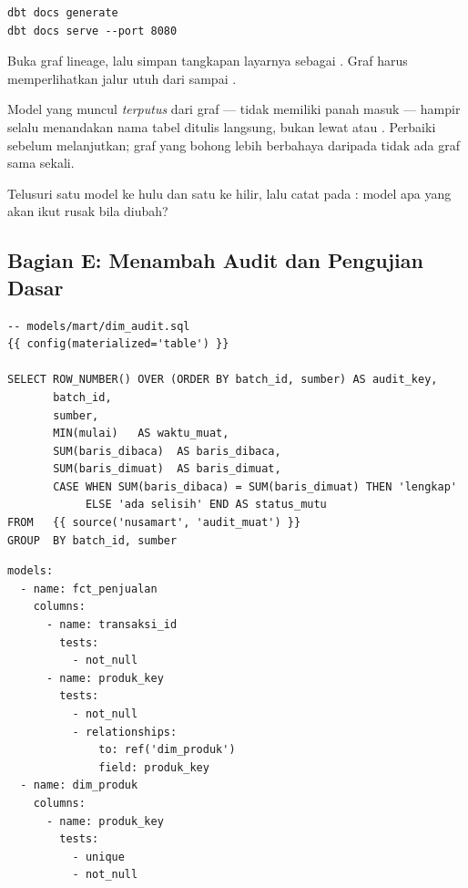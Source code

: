 
\begin{lstlisting}[style=shellgaya]
dbt docs generate
dbt docs serve --port 8080
\end{lstlisting}

Buka graf lineage, lalu simpan tangkapan layarnya sebagai
. Graf harus memperlihatkan jalur utuh dari
 sampai .

\begin{peringatan}
Model yang muncul \emph{terputus} dari graf --- tidak memiliki panah masuk ---
hampir selalu menandakan nama tabel ditulis langsung, bukan lewat
 atau . Perbaiki sebelum melanjutkan; graf yang
bohong lebih berbahaya daripada tidak ada graf sama sekali.
\end{peringatan}

Telusuri satu model ke hulu dan satu ke hilir, lalu catat pada
: model apa yang akan ikut rusak bila
 diubah?

\subsection{Bagian E: Menambah Audit dan Pengujian Dasar}


\begin{lstlisting}[style=sqlgaya]
-- models/mart/dim_audit.sql
{{ config(materialized='table') }}

SELECT ROW_NUMBER() OVER (ORDER BY batch_id, sumber) AS audit_key,
       batch_id,
       sumber,
       MIN(mulai)   AS waktu_muat,
       SUM(baris_dibaca)  AS baris_dibaca,
       SUM(baris_dimuat)  AS baris_dimuat,
       CASE WHEN SUM(baris_dibaca) = SUM(baris_dimuat) THEN 'lengkap'
            ELSE 'ada selisih' END AS status_mutu
FROM   {{ source('nusamart', 'audit_muat') }}
GROUP  BY batch_id, sumber
\end{lstlisting}


\begin{lstlisting}[style=yamlgaya]
models:
  - name: fct_penjualan
    columns:
      - name: transaksi_id
        tests:
          - not_null
      - name: produk_key
        tests:
          - not_null
          - relationships:
              to: ref('dim_produk')
              field: produk_key
  - name: dim_produk
    columns:
      - name: produk_key
        tests:
          - unique
          - not_null
\end{lstlisting}


